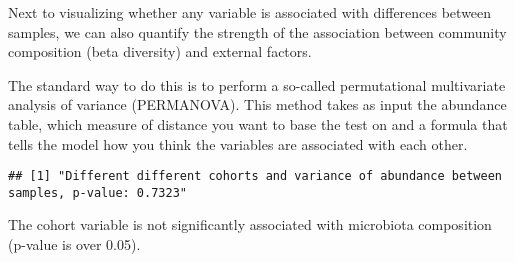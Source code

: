\documentclass[
  oneside]{book}
\newenvironment{Shaded}{\begin{snugshade}}{\end{snugshade}}
\newcommand{\AttributeTok}[1]{\textcolor[rgb]{0.77,0.63,0.00}{#1}}
\newcommand{\CommentTok}[1]{\textcolor[rgb]{0.56,0.35,0.01}{\textit{#1}}}
\newcommand{\DecValTok}[1]{\textcolor[rgb]{0.00,0.00,0.81}{#1}}
\newcommand{\FunctionTok}[1]{\textcolor[rgb]{0.00,0.00,0.00}{#1}}
\newcommand{\NormalTok}[1]{#1}
\newcommand{\OtherTok}[1]{\textcolor[rgb]{0.56,0.35,0.01}{#1}}
\newcommand{\SpecialCharTok}[1]{\textcolor[rgb]{0.00,0.00,0.00}{#1}}
\newcommand{\StringTok}[1]{\textcolor[rgb]{0.31,0.60,0.02}{#1}}
\begin{document}
Next to visualizing whether any variable is associated with
differences between samples, we can also quantify the strength of the
association between community composition (beta diversity) and
external factors.

The standard way to do this is to perform a so-called permutational
multivariate analysis of variance (PERMANOVA). This method takes as
input the abundance table, which measure of distance you want to base
the test on and a formula that tells the model how you think the
variables are associated with each other.

\begin{Shaded}
\end{Shaded}

\begin{verbatim}
## [1] "Different different cohorts and variance of abundance between samples, p-value: 0.7323"
\end{verbatim}

The cohort variable is not significantly associated with
microbiota composition (p-value is over 0.05).
\end{document}
